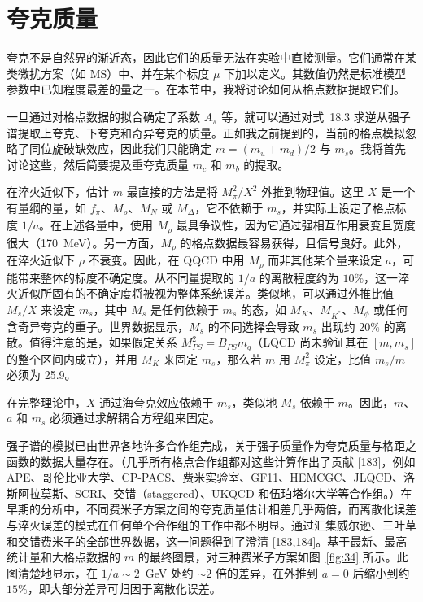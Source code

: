 \chapter{夸克质量}

夸克不是自然界的渐近态，因此它们的质量无法在实验中直接测量。它们通常在某类微扰方案（如 $\overline{\mathrm{MS}}$）中、并在某个标度 $\mu$ 下加以定义。其数值仍然是标准模型参数中已知程度最差的量之一。在本节中，我将讨论如何从格点数据提取它们。

一旦通过对格点数据的拟合确定了系数 $A_\pi$ 等，就可以通过对式~18.3 求逆从强子谱提取上夸克、下夸克和奇异夸克的质量。正如我之前提到的，当前的格点模拟忽略了同位旋破缺效应，因此我们只能确定 $m = (m_u + m_d)/2$ 与 $m_s$。我将首先讨论这些，然后简要提及重夸克质量 $m_c$ 和 $m_b$ 的提取。

在淬火近似下，估计 $m$ 最直接的方法是将 $M_\pi^2/X^2$ 外推到物理值。这里 $X$ 是一个有量纲的量，如 $f_\pi$、$M_\rho$、$M_N$ 或 $M_\Delta$，它不依赖于 $m_s$，并实际上设定了格点标度 $1/a$。在上述各量中，使用 $M_\rho$ 最具争议性，因为它通过强相互作用衰变且宽度很大（170~MeV）。另一方面，$M_\rho$ 的格点数据最容易获得，且信号良好。此外，在淬火近似下 $\rho$ 不衰变。因此，在 QQCD 中用 $M_\rho$ 而非其他某个量来设定 $a$，可能带来整体的标度不确定度。从不同量提取的 $1/a$ 的离散程度约为 $10\%$，这一淬火近似所固有的不确定度将被视为整体系统误差。类似地，可以通过外推比值 $M_s/X$ 来设定 $m_s$，其中 $M_s$ 是任何依赖于 $m_s$ 的态，如 $M_K$、$M_{K^*}$、$M_\phi$ 或任何含奇异夸克的重子。世界数据显示，$M_s$ 的不同选择会导致 $m_s$ 出现约 $20\%$ 的离散。值得注意的是，如果假定关系 $M_{PS}^2 = B_{PS} m_q$（LQCD 尚未验证其在 $[m, m_s]$ 的整个区间内成立），并用 $M_K$ 来固定 $m_s$，那么若 $m$ 用 $M_\pi^2$ 设定，比值 $m_s/m$ 必须为 25.9。

在完整理论中，$X$ 通过海夸克效应依赖于 $m_s$，类似地 $M_s$ 依赖于 $m$。因此，$m$、$a$ 和 $m_s$ 必须通过求解耦合方程组来固定。

强子谱的模拟已由世界各地许多合作组完成，关于强子质量作为夸克质量与格距之函数的数据大量存在。（几乎所有格点合作组都对这些计算作出了贡献 [183]，例如 APE、哥伦比亚大学、CP-PACS、费米实验室、GF11、HEMCGC、JLQCD、洛斯阿拉莫斯、SCRI、交错（staggered）、UKQCD 和伍珀塔尔大学等合作组。）在早期的分析中，不同费米子方案之间的夸克质量估计相差几乎两倍，而离散化误差与淬火误差的模式在任何单个合作组的工作中都不明显。通过汇集威尔逊、三叶草和交错费米子的全部世界数据，这一问题得到了澄清 [183,184]。基于最新、最高统计量和大格点数据的 $m$ 的最终图景，对三种费米子方案如图~\ref{fig:34} 所示。此图清楚地显示，在 $1/a \sim 2$~GeV 处约 $\sim 2$ 倍的差异，在外推到 $a = 0$ 后缩小到约 $15\%$，即大部分差异可归因于离散化误差。

